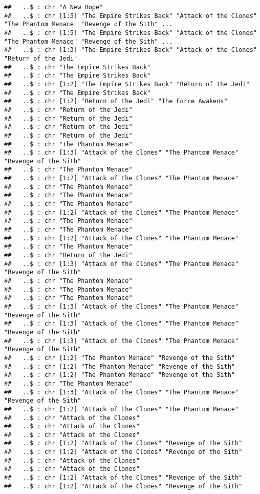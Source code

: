 \documentclass[
]{article}
\begin{document}
\begin{verbatim}
##   ..$ : chr "A New Hope"
##   ..$ : chr [1:5] "The Empire Strikes Back" "Attack of the Clones" "The Phantom Menace" "Revenge of the Sith" ...
##   ..$ : chr [1:5] "The Empire Strikes Back" "Attack of the Clones" "The Phantom Menace" "Revenge of the Sith" ...
##   ..$ : chr [1:3] "The Empire Strikes Back" "Attack of the Clones" "Return of the Jedi"
##   ..$ : chr "The Empire Strikes Back"
##   ..$ : chr "The Empire Strikes Back"
##   ..$ : chr [1:2] "The Empire Strikes Back" "Return of the Jedi"
##   ..$ : chr "The Empire Strikes Back"
##   ..$ : chr [1:2] "Return of the Jedi" "The Force Awakens"
##   ..$ : chr "Return of the Jedi"
##   ..$ : chr "Return of the Jedi"
##   ..$ : chr "Return of the Jedi"
##   ..$ : chr "Return of the Jedi"
##   ..$ : chr "The Phantom Menace"
##   ..$ : chr [1:3] "Attack of the Clones" "The Phantom Menace" "Revenge of the Sith"
##   ..$ : chr "The Phantom Menace"
##   ..$ : chr [1:2] "Attack of the Clones" "The Phantom Menace"
##   ..$ : chr "The Phantom Menace"
##   ..$ : chr "The Phantom Menace"
##   ..$ : chr "The Phantom Menace"
##   ..$ : chr [1:2] "Attack of the Clones" "The Phantom Menace"
##   ..$ : chr "The Phantom Menace"
##   ..$ : chr "The Phantom Menace"
##   ..$ : chr [1:2] "Attack of the Clones" "The Phantom Menace"
##   ..$ : chr "The Phantom Menace"
##   ..$ : chr "Return of the Jedi"
##   ..$ : chr [1:3] "Attack of the Clones" "The Phantom Menace" "Revenge of the Sith"
##   ..$ : chr "The Phantom Menace"
##   ..$ : chr "The Phantom Menace"
##   ..$ : chr "The Phantom Menace"
##   ..$ : chr [1:3] "Attack of the Clones" "The Phantom Menace" "Revenge of the Sith"
##   ..$ : chr [1:3] "Attack of the Clones" "The Phantom Menace" "Revenge of the Sith"
##   ..$ : chr [1:3] "Attack of the Clones" "The Phantom Menace" "Revenge of the Sith"
##   ..$ : chr [1:2] "The Phantom Menace" "Revenge of the Sith"
##   ..$ : chr [1:2] "The Phantom Menace" "Revenge of the Sith"
##   ..$ : chr [1:2] "The Phantom Menace" "Revenge of the Sith"
##   ..$ : chr "The Phantom Menace"
##   ..$ : chr [1:3] "Attack of the Clones" "The Phantom Menace" "Revenge of the Sith"
##   ..$ : chr [1:2] "Attack of the Clones" "The Phantom Menace"
##   ..$ : chr "Attack of the Clones"
##   ..$ : chr "Attack of the Clones"
##   ..$ : chr "Attack of the Clones"
##   ..$ : chr [1:2] "Attack of the Clones" "Revenge of the Sith"
##   ..$ : chr [1:2] "Attack of the Clones" "Revenge of the Sith"
##   ..$ : chr "Attack of the Clones"
##   ..$ : chr "Attack of the Clones"
##   ..$ : chr [1:2] "Attack of the Clones" "Revenge of the Sith"
##   ..$ : chr [1:2] "Attack of the Clones" "Revenge of the Sith"

\end{verbatim}
\end{document}
